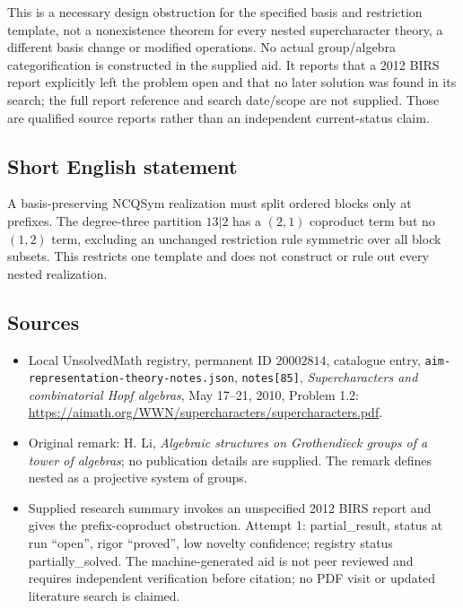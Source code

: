 \documentclass[11pt]{article}
\begin{document}
This is a necessary design obstruction for the specified basis and restriction template, not a nonexistence theorem for every nested supercharacter theory, a different basis change or modified operations. No actual group/algebra categorification is constructed in the supplied aid. It reports that a 2012 BIRS report explicitly left the problem open and that no later solution was found in its search; the full report reference and search date/scope are not supplied. Those are qualified source reports rather than an independent current-status claim.
\subsection{Short English statement}
A basis-preserving NCQSym realization must split ordered blocks only at prefixes. The degree-three partition \(13|2\) has a \((2,1)\) coproduct term but no \((1,2)\) term, excluding an unchanged restriction rule symmetric over all block subsets. This restricts one template and does not construct or rule out every nested realization.
\subsection{Sources}
\begin{itemize}
\item Local UnsolvedMath registry, permanent ID \(20002814\), catalogue entry, \texttt{aim-representation-theory-notes.json}, \texttt{notes[85]}, \emph{Supercharacters and combinatorial Hopf algebras}, May 17--21, 2010, Problem 1.2: \url{https://aimath.org/WWN/supercharacters/supercharacters.pdf}.
\item Original remark: H. Li, \emph{Algebraic structures on Grothendieck groups of a tower of algebras}; no publication details are supplied. The remark defines nested as a projective system of groups.
\item Supplied research summary invokes an unspecified 2012 BIRS report and gives the prefix-coproduct obstruction. Attempt 1: partial\_result, status at run ``open'', rigor ``proved'', low novelty confidence; registry status partially\_solved. The machine-generated aid is not peer reviewed and requires independent verification before citation; no PDF visit or updated literature search is claimed.
\end{itemize}
\end{document}
